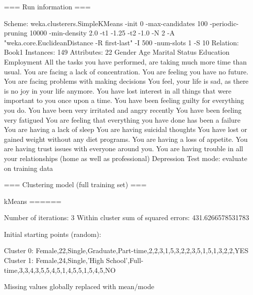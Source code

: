 === Run information ===

Scheme:       weka.clusterers.SimpleKMeans -init 0 -max-candidates 100 -periodic-pruning 10000 -min-density 2.0 -t1 -1.25 -t2 -1.0 -N 2 -A "weka.core.EuclideanDistance -R first-last" -I 500 -num-slots 1 -S 10
Relation:     Book1
Instances:    149
Attributes:   22
              Gender
              Age
              Marital Status
              Education
              Employment
              All the tasks you have performed, are taking much more time than usual.
              You are facing a lack of concentration.
              You are feeling you have no future.
              You are facing problems with making decisions
              You feel, your life is sad, as there is no joy in your life anymore.
              You have lost interest in all things that were important to you once upon a time.
              You have been feeling guilty for everything you do.
              You have been very irritated and angry recently
              You have been feeling very fatigued
              You are feeling that everything you have done has been a failure
              You are having a lack of sleep
              You are having suicidal thoughts
              You have lost or gained weight without any diet programs.
              You are having a loss of appetite.
              You are having trust issues with everyone around you.
              You are having trouble in all your relationships (home as well as professional)
              Depression
Test mode:    evaluate on training data


=== Clustering model (full training set) ===


kMeans
======

Number of iterations: 3
Within cluster sum of squared errors: 431.6266578531783

Initial starting points (random):

Cluster 0: Female,22,Single,Graduate,Part-time,2,2,3,1,5,3,2,2,3,5,1,5,1,3,2,2,YES
Cluster 1: Female,24,Single,'High School',Full-time,3,3,4,3,5,5,4,5,1,4,5,5,1,5,4,5,NO

Missing values globally replaced with mean/mode

